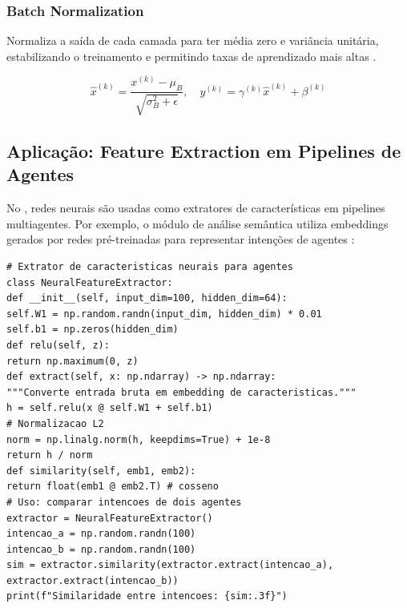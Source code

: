 \subsubsection{Batch Normalization}
\begin{definicao}
Normaliza a saída de cada camada para ter média zero e variância unitária,
estabilizando o treinamento e permitindo taxas de aprendizado mais altas
\cite{ioffe2015batch}.
\end{definicao}
\[\hat{x}^{(k)} = \frac{x^{(k)} - \mu_B}{\sqrt{\sigma_B^2 + \epsilon}}, \quad
y^{(k)} = \gamma^{(k)} \hat{x}^{(k)} + \beta^{(k)}
\]
\subsection{Aplicação: Feature Extraction em Pipelines de Agentes}
No \opencodeeco{}, redes neurais são usadas como extratores de
características em pipelines multiagentes. Por exemplo, o módulo de
análise semântica utiliza embeddings gerados por redes pré-treinadas para
representar intenções de agentes \cite{opencode2026ecosystem}:
\begin{lstlisting}[style=pythonstyle]
# Extrator de caracteristicas neurais para agentes
class NeuralFeatureExtractor:
def __init__(self, input_dim=100, hidden_dim=64):
self.W1 = np.random.randn(input_dim, hidden_dim) * 0.01
self.b1 = np.zeros(hidden_dim)
def relu(self, z):
return np.maximum(0, z)
def extract(self, x: np.ndarray) -> np.ndarray:
"""Converte entrada bruta em embedding de caracteristicas."""
h = self.relu(x @ self.W1 + self.b1)
# Normalizacao L2
norm = np.linalg.norm(h, keepdims=True) + 1e-8
return h / norm
def similarity(self, emb1, emb2):
return float(emb1 @ emb2.T) # cosseno
# Uso: comparar intencoes de dois agentes
extractor = NeuralFeatureExtractor()
intencao_a = np.random.randn(100)
intencao_b = np.random.randn(100)
sim = extractor.similarity(extractor.extract(intencao_a),
extractor.extract(intencao_b))
print(f"Similaridade entre intencoes: {sim:.3f}")
\end{lstlisting}
